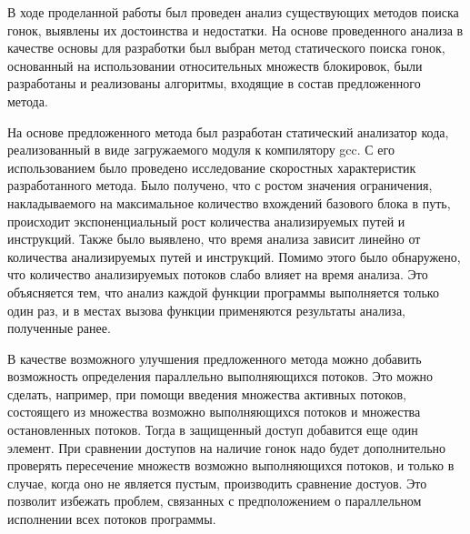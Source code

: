 \Conclusion

В ходе проделанной работы был проведен анализ существующих методов поиска гонок, выявлены их достоинства и недостатки. На основе проведенного анализа в качестве основы для разработки был выбран метод статического поиска гонок, основанный на использовании относительных множеств блокировок, были разработаны и реализованы алгоритмы, входящие в состав предложенного метода.

На основе предложенного метода был разработан статический анализатор кода, реализованный в виде загружаемого модуля к компилятору gcc. С его использованием было проведено исследование скоростных характеристик разработанного метода. Было получено, что с ростом значения ограничения, накладываемого на максимальное количество вхождений базового блока в путь, происходит экспоненциальный рост количества анализируемых путей и инструкций. Также было выявлено, что время анализа  зависит линейно от количества анализируемых путей и инструкций. Помимо этого было обнаружено, что количество анализируемых  потоков слабо влияет на время анализа. Это объясняется тем, что анализ каждой функции программы выполняется только один раз, и в местах вызова функции применяются результаты анализа, полученные ранее.

В качестве возможного улучшения предложенного метода можно добавить возможность определения параллельно выполняющихся потоков. Это можно сделать, например, при помощи введения множества активных потоков, состоящего из множества возможно выполняющихся потоков и множества остановленных потоков. Тогда в защищенный доступ добавится еще один элемент. При сравнении доступов на наличие гонок надо будет дополнительно проверять пересечение множеств возможно выполняющихся потоков, и только в случае, когда оно не является пустым, производить сравнение достуов. Это позволит избежать проблем, связанных с предположением о параллельном исполнении всех потоков программы.
